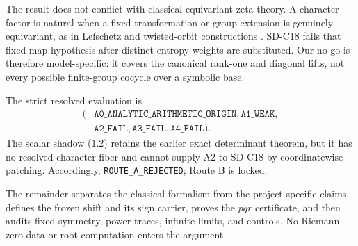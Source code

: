 The result does not conflict with classical equivariant zeta theory.  A
character factor is natural when a fixed transformation or group extension
is genuinely equivariant, as in Lefschetz and twisted-orbit constructions
\citep{GuseinZadeLuengoMelle2015EquivariantZeta,Pollicott1994TwistedOrbits}.
SD-C18 fails that fixed-map hypothesis after distinct entropy weights are
substituted.  Our no-go is therefore model-specific: it covers the canonical
rank-one and diagonal lifts, not every possible finite-group cocycle over a
symbolic base.

The strict resolved evaluation is
\[
\begin{split}
(&\texttt{A0\_ANALYTIC\_ARITHMETIC\_ORIGIN},
  \texttt{A1\_WEAK},\\
 &\texttt{A2\_FAIL},\texttt{A3\_FAIL},\texttt{A4\_FAIL}).
\end{split}
\tag{1.5}
\]
The scalar shadow (1.2) retains the earlier exact determinant theorem, but it
has no resolved character fiber and cannot supply A2 to SD-C18 by
coordinatewise patching.  Accordingly, \texttt{ROUTE\_A\_REJECTED}; Route B
is locked.

The remainder separates the classical formalism from the project-specific
claims, defines the frozen shift and its sign carrier, proves the $pqr$
certificate, and then audits fixed symmetry, power traces, infinite limits,
and controls.  No Riemann-zero data or root computation enters the argument.
